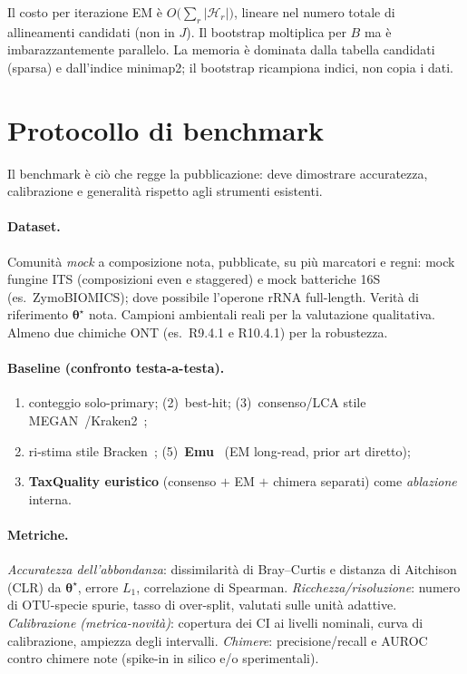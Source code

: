 \documentclass[11pt,a4paper]{article}
\newcommand{\bt}{\boldsymbol{\theta}}
\newcommand{\Hyp}{\mathcal{H}}
\begin{document}
\medskip\noindent Il costo per iterazione EM \`e $O\!\big(\sum_r|\Hyp_r|\big)$, lineare nel numero totale di allineamenti candidati (non in $J$). Il bootstrap moltiplica per $B$ ma \`e imbarazzantemente parallelo. La memoria \`e dominata dalla tabella candidati (sparsa) e dall'indice minimap2; il bootstrap ricampiona indici, non copia i dati.

\section{Protocollo di benchmark}
Il benchmark \`e ci\`o che regge la pubblicazione: deve dimostrare accuratezza, calibrazione e generalit\`a rispetto agli strumenti esistenti.

\paragraph{Dataset.} Comunit\`a \emph{mock} a composizione nota, pubblicate, su pi\`u marcatori e regni: mock fungine ITS (composizioni even e staggered) e mock batteriche 16S (es.\ ZymoBIOMICS); dove possibile l'operone rRNA full-length. Verit\`a di riferimento $\bt^\star$ nota. Campioni ambientali reali per la valutazione qualitativa. Almeno due chimiche ONT (es.\ R9.4.1 e R10.4.1) per la robustezza.

\paragraph{Baseline (confronto testa-a-testa).}
\begin{enumerate}[nosep,leftmargin=1.4em]
\item conteggio solo-primary; \quad (2)~best-hit; \quad (3)~consenso/LCA stile MEGAN~\cite{megan}/Kraken2~\cite{kraken2};
\item ri-stima stile Bracken~\cite{bracken}; \quad (5)~\textbf{Emu}~\cite{emu} (EM long-read, prior art diretto);
\item \textbf{TaxQuality euristico} (consenso $+$ EM $+$ chimera separati) come \emph{ablazione} interna.
\end{enumerate}

\paragraph{Metriche.}
\emph{Accuratezza dell'abbondanza}: dissimilarit\`a di Bray--Curtis e distanza di Aitchison (CLR) da $\bt^\star$, errore $L_1$, correlazione di Spearman.
\emph{Ricchezza/risoluzione}: numero di OTU-specie spurie, tasso di over-split, valutati sulle unit\`a adattive.
\emph{Calibrazione (metrica-novit\`a)}: copertura dei CI ai livelli nominali, curva di calibrazione, ampiezza degli intervalli.
\emph{Chimere}: precisione/recall e AUROC contro chimere note (spike-in in silico e/o sperimentali).
\end{document}
